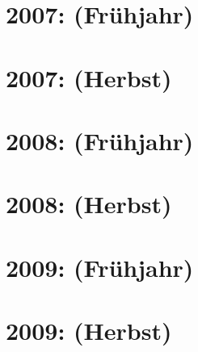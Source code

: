 \documentclass{lehramt-informatik-haupt}
\begin{document}
\section{2007: (Frühjahr)}


\section{2007: (Herbst)}


\section{2008: (Frühjahr)}


\section{2008: (Herbst)}


\section{2009: (Frühjahr)}


\section{2009: (Herbst)}

\end{document}
